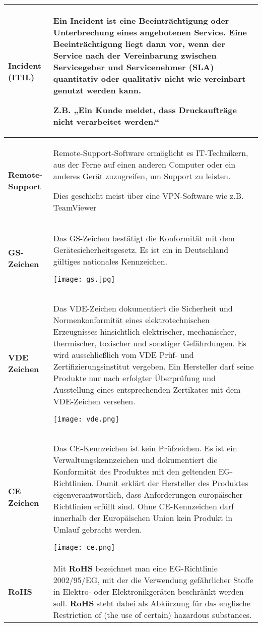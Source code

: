 \documentclass[asp1.tex]{subfiles}
\begin{document}
\begin{longtable}{|p{}|p{}|}
        \textbf{Incident (ITIL)}&
        Ein Incident ist eine Beeinträchtigung oder Unterbrechung eines angebotenen Service. Eine Beeinträchtigung liegt dann vor, wenn der Service nach der Vereinbarung zwischen Servicegeber und Servicenehmer (SLA) quantitativ oder qualitativ nicht wie vereinbart genutzt werden kann.

        Z.B. „Ein Kunde meldet, dass Druckaufträge nicht verarbeitet werden.“
        \\\hline

        \textbf{Remote-Support}&
        Remote-Support-Software ermöglicht es IT-Technikern, aus der Ferne auf einen anderen Computer oder ein anderes Gerät zuzugreifen, um Support zu leisten.

        Dies geschieht meist über eine VPN-Software wie z.B. TeamViewer
        \\\hline

        \textbf{GS-Zeichen}&
        Das GS-Zeichen bestätigt die Konformität mit dem Gerätesicherheitsgesetz. Es ist ein in Deutschland gültiges nationales Kennzeichen.

        \texttt{[image: gs.jpg]}
        \\\hline

        \textbf{VDE Zeichen}&
        Das VDE-Zeichen dokumentiert die Sicherheit und Normenkonformität eines elektrotechnischen Erzeugnisses hinsichtlich elektrischer, mechanischer, thermischer, toxischer und sonstiger Gefährdungen. Es wird ausschließlich vom VDE Prüf- und Zertifizierungsinstitut vergeben. Ein Hersteller darf seine Produkte nur nach erfolgter Überprüfung und Ausstellung eines entsprechenden Zertikates mit dem VDE-Zeichen versehen.

        \texttt{[image: vde.png]}
        \\\hline

        \textbf{CE Zeichen}&
        Das CE-Kennzeichen ist kein Prüfzeichen. Es ist ein Verwaltungskennzeichen und dokumentiert die Konformität des Produktes mit den geltenden EG-Richtlinien. Damit erklärt der Hersteller des Produktes eigenverantwortlich, dass Anforderungen europäischer Richtlinien erfüllt sind. Ohne CE-Kennzeichen darf innerhalb der Europäischen Union kein Produkt in Umlauf gebracht werden.

        \texttt{[image: ce.png]}
        \\\hline

        \textbf{RoHS}&
        Mit \textbf{RoHS} bezeichnet man eine EG-Richtlinie 2002/95/EG, mit der die Verwendung gefährlicher Stoffe in Elektro- oder Elektronikgeräten beschränkt werden soll. \textbf{RoHS} steht dabei als Abkürzung für das englische Restriction of (the use of certain) hazardous substances.
        \\\hline


\end{longtable}
\end{document}
